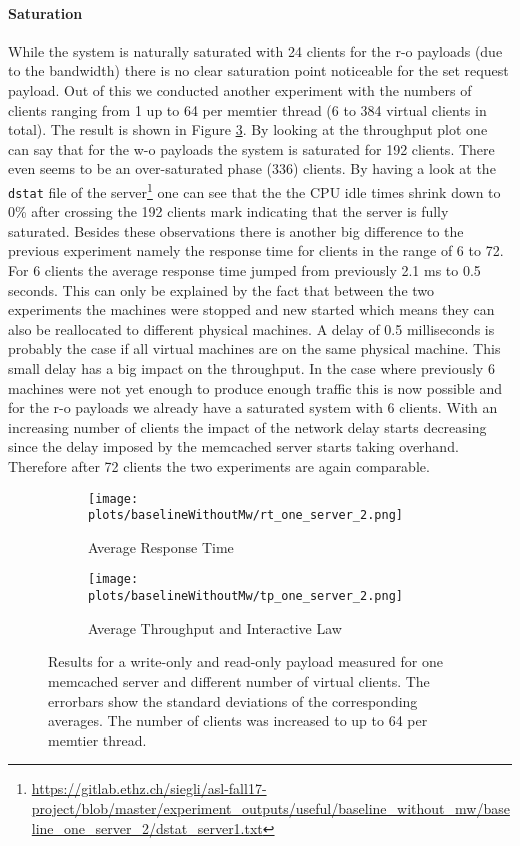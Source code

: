 \documentclass[11pt,a4paper]{article}
\let\tt\texttt
\begin{document}
\paragraph{Saturation}
While the system is naturally saturated with 24 clients for the r-o payloads (due to the bandwidth) there is no clear saturation point noticeable for the set request payload. Out of this we conducted another experiment with the numbers of clients ranging from 1 up to 64 per memtier thread (6 to 384 virtual clients in total). The result is shown in Figure \ref{plt:bl:one_server_2}. By looking at the throughput plot one can say that for the w-o payloads the system is saturated for 192 clients. There even seems to be an over-saturated phase (336) clients. By having a look at the \tt{dstat} file of the server\footnote{\url{https://gitlab.ethz.ch/siegli/asl-fall17-project/blob/master/experiment_outputs/useful/baseline_without_mw/baseline_one_server_2/dstat_server1.txt}} one can see that the the CPU idle times shrink down to 0\% after crossing the 192 clients mark indicating that the server is fully saturated. Besides these observations there is another big difference to the previous experiment namely the response time for clients in the range of 6 to 72. For 6 clients the average response time jumped from previously 2.1 ms to 0.5 seconds. This can only be explained by the fact that between the two experiments the machines were stopped and new started which means they can also be reallocated to different physical machines. A delay of 0.5 milliseconds is probably the case if all virtual machines are on the same physical machine. This small delay has a big impact on the throughput. In the case where previously 6 machines were not yet enough to produce enough traffic this is now possible and for the r-o payloads we already have a saturated system with 6 clients. With an increasing number of clients the impact of the network delay starts decreasing since the delay imposed by the memcached server starts taking overhand. Therefore after 72 clients the two experiments are again comparable.


\begin{figure}[H]
\centering
\begin{subfigure}{.5\textwidth}
    \centering
    \texttt{[image: plots/baselineWithoutMw/rt\_one\_server\_2.png]}
    \caption{Average Response Time }
    \label{plt:bl:rt_one_server_2}
\end{subfigure}%
\begin{subfigure}{.5\textwidth}
    \centering
    \texttt{[image: plots/baselineWithoutMw/tp\_one\_server\_2.png]}
    \caption{Average Throughput and Interactive Law}
    \label{plt:bl:tp_one_server_2}

\end{subfigure}
\caption{Results for a write-only and read-only payload measured for one memcached server and different number of virtual clients. The errorbars show the standard deviations of the corresponding averages. The number of clients was increased to up to 64 per memtier thread.}
\label{plt:bl:one_server_2}
\end{figure}
\end{document}
